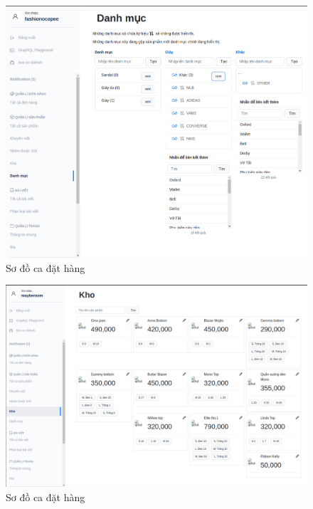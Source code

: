 \begin{figure}[h!]
	\begin{center}	
		\includegraphics[width=\textwidth]{./results/categories}
		\caption{Sơ đồ ca đặt hàng}
	\end{center}
\end{figure}


\begin{figure}[h!]
	\begin{center}	
		\includegraphics[width=\textwidth]{./results/stock}
		\caption{Sơ đồ ca đặt hàng}
	\end{center}
\end{figure}



